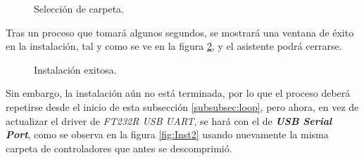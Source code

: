 \begin{figure}[H] %
\caption[1]{Selección de carpeta.}
\label{fig:Subf}
\end{figure}

Tras un proceso que tomará algunos segundos, se mostrará una ventana de éxito en la instalación, tal y como se ve en la figura \ref{fig:Inst1}, y el asistente podrá cerrarse.

\begin{figure}[H] %
\caption[1]{Instalación exitosa.}
\label{fig:Inst1}
\end{figure}

Sin embargo, la instalación aún no está terminada, por lo que el proceso deberá repetirse desde el inicio de esta subsección \ref{subsubsec:loop}, pero ahora, en vez de actualizar el driver de \textit{FT232R USB UART}, se hará con el de \textit{\textbf{USB Serial Port}}, como se observa en la figura \ref{fig:Inst2} usando nuevamente la misma carpeta de controladores que antes se descomprimió.

